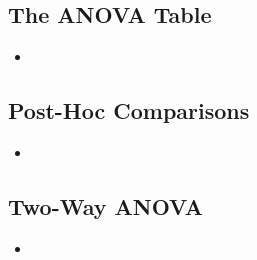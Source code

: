 \begin{itemize}
\begin{itemize}
  \end{itemize}

  \subsection{The ANOVA Table}
  \begin{itemize}
    \item 
  \end{itemize}

  \subsection{Post-Hoc Comparisons}
  \begin{itemize}
    \item 
  \end{itemize}
  
  \subsection{Two-Way ANOVA}
  \begin{itemize}
    \item 
  \end{itemize}
  
\end{itemize}
